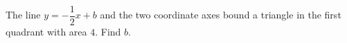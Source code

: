 The line $y=-\dfrac12x+b$ and the two coordinate axes bound a triangle in the first quadrant with area $4$. Find $b$.

